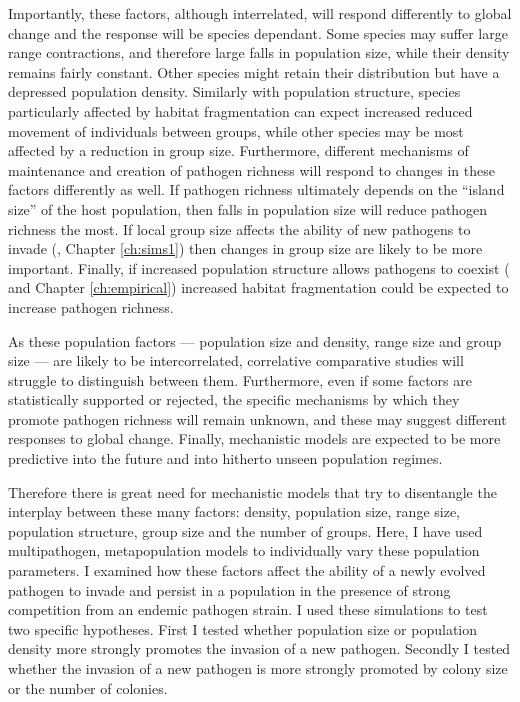 
Importantly, these factors, although interrelated, will respond differently to global change and the response will be species dependant.
Some species may suffer large range contractions, and therefore large falls in population size, while their density remains fairly constant.
Other species might retain their distribution but have a depressed population density.
Similarly with population structure, species particularly affected by habitat fragmentation can expect increased reduced movement of individuals between groups, while other species may be most affected by a reduction in group size.
Furthermore, different mechanisms of maintenance and creation of pathogen richness will respond to changes in these factors differently as well.
If pathogen richness ultimately depends on the ``island size'' of the host population, then falls in population size will reduce pathogen richness the most.
If local group size affects the ability of new pathogens to invade (\textcite{nunn2003comparative}, Chapter \ref{ch:sims1}) then changes in group size are likely to be more important.
Finally, if increased population structure allows pathogens to coexist (\textcite{qiu2013vector, allen2004sis, nunes2006localized} and Chapter \ref{ch:empirical}) increased habitat fragmentation could be expected to increase pathogen richness.

As these population factors --- population size and density, range size and group size --- are likely to be intercorrelated, correlative comparative studies will struggle to distinguish between them.
Furthermore, even if some factors are statistically supported or rejected, the specific mechanisms by which they promote pathogen richness will remain unknown, and these may suggest different responses to global change.
Finally, mechanistic models are expected to be more predictive into the future and into hitherto unseen population regimes.







Therefore there is great need for mechanistic models that try to disentangle the interplay between these many factors: density, population size, range size, population structure, group size and the number of groups.
Here, I have used multipathogen, metapopulation models to individually vary these population parameters.
I examined how these factors affect the ability of a newly evolved pathogen to invade and persist in a population in the presence of strong competition from an endemic pathogen strain.
I used these simulations to test two specific hypotheses.
First I tested whether population size or population density more strongly promotes the invasion of a new pathogen.
Secondly I tested whether the invasion of a new pathogen is more strongly promoted by colony size or the number of colonies.


